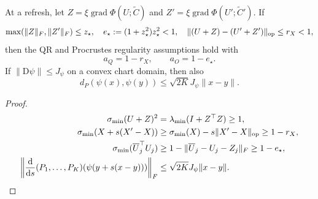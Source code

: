 \begin{corollary}\label{cor:rigid-regularity-radius}
At a refresh, let $Z=\xi\operatorname{grad}\Phi(U;\widetilde C)$ and
$Z'=\xi\operatorname{grad}\Phi(U';\widetilde C')$. If
\begin{gather}
 \max(\|Z\|_F,\|Z'\|_F)\le z_\star,\quad
 e_\star:=(1+z_\star^2)z_\star^2<1,\quad
 \|(U+Z)-(U'+Z')\|_{\mathrm{op}}\le r_X<1,
\end{gather}
then the QR and Procrustes regularity assumptions hold with
\begin{equation}
 a_Q=1-r_X,\qquad a_O=1-e_\star.
\end{equation}
If $\|\mathrm D\psi\|\le J_\psi$ on a convex chart domain, then also
\begin{equation}
 d_P(\psi(x),\psi(y))\le\sqrt{2K}J_\psi\|x-y\|.
\end{equation}
\end{corollary}
\begin{proof}
\begin{align}
 \sigma_{\min}(U+Z)^2
 &=\lambda_{\min}(I+Z^\top Z)\ge1,\\
 \sigma_{\min}(X+s(X'-X))&\ge\sigma_{\min}(X)-s\|X'-X\|_{\mathrm{op}}\ge1-r_X,\\
 \sigma_{\min}(\overline U_j^\top U_j)
 &\ge1-\|\overline U_j-U_j-Z_j\|_F\ge1-e_\star,\\
 \left\|\frac{\mathrm d}{\mathrm ds}(P_1,\ldots,P_K)
                     (\psi(y+s(x-y)))\right\|_F
 &\le\sqrt{2K}J_\psi\|x-y\|.
\end{align}
\end{proof}

